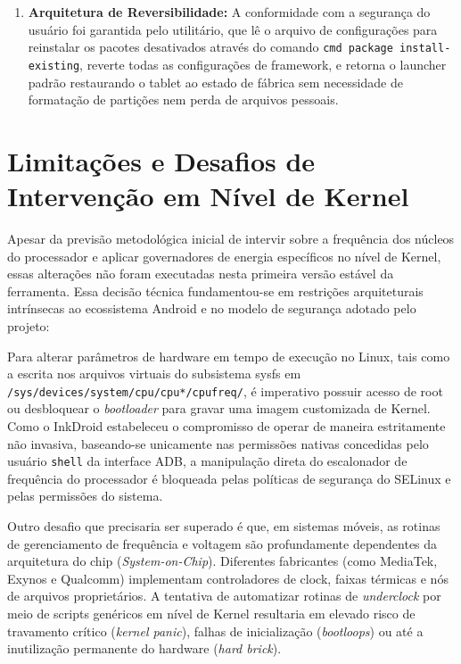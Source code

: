 \documentclass[
    12pt,
    openright,
    oneside,
    a4paper,
    english,
    brazilian
    ]{abntex2}
\begin{document}
\begin{enumerate}
  \item \textbf{Arquitetura de Reversibilidade:} A conformidade com a segurança do usuário foi garantida pelo utilitário, que lê o arquivo de configurações para reinstalar os pacotes desativados através do comando \texttt{cmd package install-existing}, reverte todas as configurações de framework, e retorna o launcher padrão restaurando o tablet ao estado de fábrica sem necessidade de formatação de partições nem perda de arquivos pessoais.

\end{enumerate}

\section{Limitações e Desafios de Intervenção em Nível de Kernel}

Apesar da previsão metodológica inicial de intervir sobre a frequência dos núcleos do processador e aplicar governadores de energia específicos no nível de Kernel, essas alterações não foram executadas nesta primeira versão estável da ferramenta. Essa decisão técnica fundamentou-se em restrições arquiteturais intrínsecas ao ecossistema Android e no modelo de segurança adotado pelo projeto:

Para alterar parâmetros de hardware em tempo de execução no Linux, tais como a escrita nos arquivos virtuais do subsistema sysfs em \texttt{/sys/devices/system/cpu/cpu*/cpufreq/}, é imperativo possuir acesso de root ou desbloquear o \textit{bootloader} para gravar uma imagem customizada de Kernel. Como o InkDroid estabeleceu o compromisso de operar de maneira estritamente não invasiva, baseando-se unicamente nas permissões nativas concedidas pelo usuário \texttt{shell} da interface ADB, a manipulação direta do escalonador de frequência do processador é bloqueada pelas políticas de segurança do SELinux e pelas permissões do sistema.

Outro desafio que precisaria ser superado é que, em sistemas móveis, as rotinas de gerenciamento de frequência e voltagem são profundamente dependentes da arquitetura do chip (\textit{System-on-Chip}). Diferentes fabricantes (como MediaTek, Exynos e Qualcomm) implementam controladores de clock, faixas térmicas e nós de arquivos proprietários. A tentativa de automatizar rotinas de \textit{underclock} por meio de scripts genéricos em nível de Kernel resultaria em elevado risco de travamento crítico (\textit{kernel panic}), falhas de inicialização (\textit{bootloops}) ou até a inutilização permanente do hardware (\textit{hard brick}).
\end{document}
